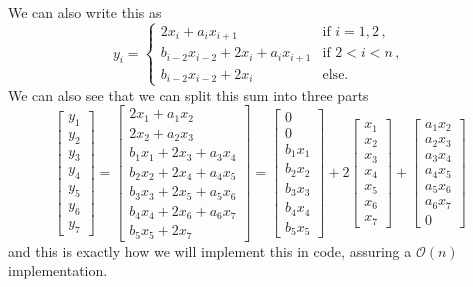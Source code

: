 \documentclass{article}
\begin{document}
We can also write this as
\begin{equation*}
    y_{i} = 
    \begin{cases}
    2x_{i} + a_{i}x_{i +1} \quad &\text{if } i = 1,2 \, , \\
    b_{i - 2}x_{i - 2} + 2x_{i} + a_{i}x_{i+1} &\text{if } 2 < i < n  \, , \\
    b_{i-2}x_{i-2} + 2x_{i} &\text{else.}
    \end{cases}
\end{equation*}
We can also see that we can split this sum into three parts
\begin{equation*}
    \begin{bmatrix}
        y_{1} \\ y_{2}  \\ y_{3} \\ y_{4} \\ y_{5} \\ y_{6} \\ y_{7}
    \end{bmatrix} = \begin{bmatrix}
        2x_{1} + a_{1}x_{2} \\
        2x_{2} + a_{2}x_{3} \\
        b_{1}x_{1} + 2x_{3} + a_{3}x_{4} \\
        b_{2}x_{2} + 2x_{4} + a_{4}x_{5} \\
        b_{3}x_{3} + 2x_{5} + a_{5}x_{6} \\
        b_{4}x_{4} + 2x_{6} + a_{6}x_{7} \\
        b_{5}x_{5} + 2x_{7}
    \end{bmatrix}
    = \begin{bmatrix}
        0 \\ 0 \\ b_{1}x_{1} \\
        b_{2}x_{2} \\
        b_{3}x_{3} \\
        b_{4}x_{4} \\
        b_{5}x_{5}
    \end{bmatrix}
    + 
    2\begin{bmatrix}
        x_{1} \\
        x_{2} \\
        x_{3} \\
        x_{4} \\
        x_{5} \\
        x_{6} \\
        x_{7}
    \end{bmatrix}
    + 
    \begin{bmatrix}
        a_{1}x_{2} \\
        a_{2}x_{3} \\
        a_{3}x_{4} \\
        a_{4}x_{5} \\
        a_{5}x_{6} \\
        a_{6}x_{7} \\
        0
    \end{bmatrix}
\end{equation*}
and this is exactly how we will implement this in code, assuring a $\mathcal{O}\left(n\right)$ implementation.
\end{document}
